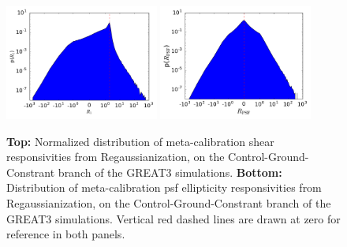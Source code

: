 \documentclass[iop]{emulateapj}
\newcommand\rmcomment[1]{\textcolor{red}{(RM: #1)}}
\begin{document}
\begin{figure}
\begin{center}
\includegraphics[width=0.45\textwidth]{./Plots/R1_hist.pdf}
\includegraphics[width=0.45\textwidth]{./Plots/a1_hist.pdf}
\end{center}
\caption{{\bf Top:} Normalized distribution of meta-calibration shear
  responsivities from Regaussianization, on the
  Control-Ground-Constrant branch of the GREAT3 simulations.  {\bf
    Bottom:} Distribution of meta-calibration psf ellipticity
  responsivities from Regaussianization, on the
  Control-Ground-Constrant branch of the GREAT3 simulations. Vertical
  red dashed lines are drawn at zero for reference in both panels.}
\label{fig:calibhist}
\end{figure}


\end{document}
